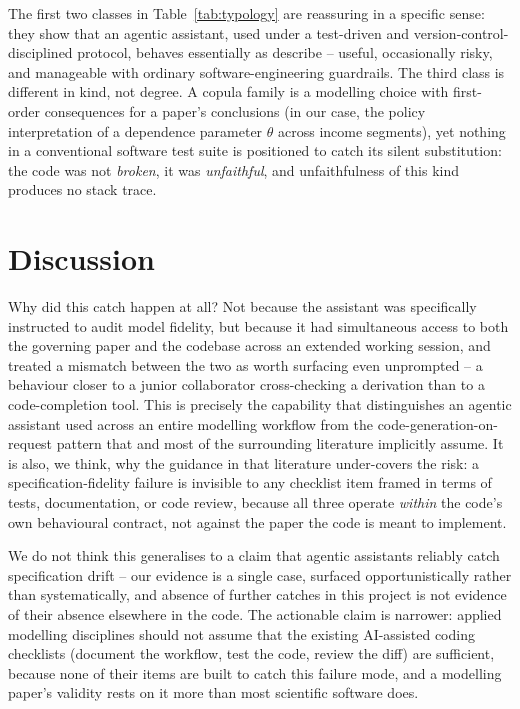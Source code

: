 \documentclass[11pt]{article}
\begin{document}
The first two classes in Table~\ref{tab:typology} are reassuring in a
specific sense: they show that an agentic assistant, used under a
test-driven and version-control-disciplined protocol, behaves
essentially as \citet{bridgeford2026} describe -- useful, occasionally
risky, and manageable with ordinary software-engineering guardrails.
The third class is different in kind, not degree. A copula family is a
modelling choice with first-order consequences for a paper's
conclusions (in our case, the policy interpretation of a dependence
parameter $\theta$ across income segments), yet nothing in a
conventional software test suite is positioned to catch its silent
substitution: the code was not \emph{broken}, it was \emph{unfaithful},
and unfaithfulness of this kind produces no stack trace.

\section{Discussion}
\label{sec:discussion}

Why did this catch happen at all? Not because the assistant was
specifically instructed to audit model fidelity, but because it had
simultaneous access to both the governing paper and the codebase across
an extended working session, and treated a mismatch between the two as
worth surfacing even unprompted -- a behaviour closer to a junior
collaborator cross-checking a derivation than to a code-completion
tool. This is precisely the capability that distinguishes an agentic
assistant used across an entire modelling workflow from the
code-generation-on-request pattern that \citet{bridgeford2026} and most
of the surrounding literature implicitly assume. It is also, we think,
why the guidance in that literature under-covers the risk: a
specification-fidelity failure is invisible to any checklist item
framed in terms of tests, documentation, or code review, because all
three operate \emph{within} the code's own behavioural contract, not
against the paper the code is meant to implement.

We do not think this generalises to a claim that agentic assistants
reliably catch specification drift -- our evidence is a single case,
surfaced opportunistically rather than systematically, and absence of
further catches in this project is not evidence of their absence
elsewhere in the code. The actionable claim is narrower: applied
modelling disciplines should not assume that the existing AI-assisted
coding checklists (document the workflow, test the code, review the
diff) are sufficient, because none of their items are built to catch
this failure mode, and a modelling paper's validity rests on it more
than most scientific software does.
\end{document}
